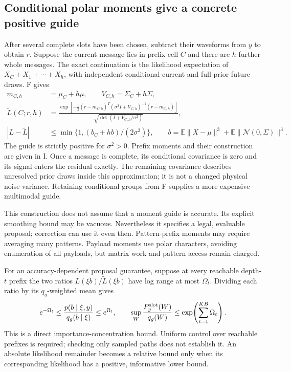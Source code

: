 \documentclass[10pt,a4paper]{article}
\newcommand{\E}{\mathbb E}
\begin{document}
\subsection{Conditional polar moments give a concrete positive guide}
After several complete slots have been chosen, subtract their waveforms from $y$ to obtain $r$.
Suppose the current message lies in prefix cell $C$ and there are $h$ further whole messages. The exact
continuation is the likelihood expectation of
$X_C+X_1+\cdots+X_h$, with independent conditional-current and full-prior future draws. F gives
\begin{align}
 m_{C,h}&=\mu_C+h\mu,\qquad V_{C,h}=\Sigma_C+h\Sigma,\\
 \widetilde L(C;r,h)&=
 \frac{\exp[-\tfrac12(r-m_{C,h})^T(\sigma^2I+V_{C,h})^{-1}(r-m_{C,h})]}
      {\sqrt{\det(I+V_{C,h}/\sigma^2)}},\label{eq:guided-likelihood}\\
 |L-\widetilde L|&\leq
 \min\{1,(b_C+h b)/(2\sigma^3)\},\qquad
 b=\E\|X-\mu\|^3+\E\|\mathcal N(0,\Sigma)\|^3.
 \label{eq:guided-remainder}
\end{align}
The guide is strictly positive for $\sigma^2>0$. Prefix moments and their construction are given in I.
Once a message is complete, its conditional covariance is zero and its signal enters the residual exactly.
The remaining covariance describes unresolved prior draws inside this approximation; it is not a changed
physical noise variance. Retaining conditional groups from F supplies a more expensive multimodal guide.

This construction does not assume that a moment guide is accurate. Its explicit smoothing bound may be
vacuous. Nevertheless it specifies a legal, evaluable proposal; correction can use it even then.
Pattern-prefix moments may require averaging many patterns. Payload moments use polar characters, avoiding
enumeration of all payloads, but matrix work and pattern access remain charged.

For an accuracy-dependent proposal guarantee, suppose at every reachable depth-$t$ prefix the two ratios
$L(\xi b)/\widetilde L(\xi b)$ have log range at most $\Omega_t$. Dividing each ratio by its
$q_g$-weighted mean gives
\[
 e^{-\Omega_t}\leq\frac{p(b\mid\xi,y)}{q_g(b\mid\xi)}\leq e^{\Omega_t},\qquad
 \sup_W\frac{P_y^{\rm slot}(W)}{q_g(W)}\leq
                 \exp\!\left(\sum_{t=1}^{KB}\Omega_t\right).
\]
This is a direct importance-concentration bound. Uniform control over reachable prefixes is required;
checking only sampled paths does not establish it. An absolute likelihood remainder becomes a relative
bound only when its corresponding likelihood has a positive, informative lower bound.
\end{document}
